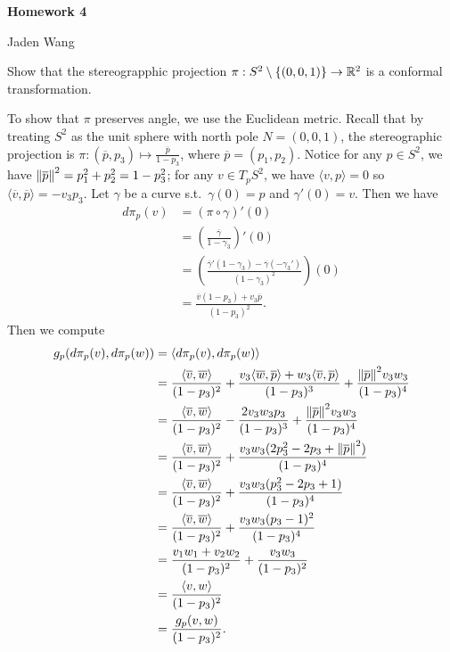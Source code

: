 \documentclass[12pt]{article}
\begin{document}
\centerline {\textsf{\textbf{\LARGE{Homework 4}}}}
\centerline {Jaden Wang}
\vspace{.15in}
\begin{problem}[LN12 0.2.2]
Show that the stereograpphic projection $ \pi: S^2 \setminus \{(0,0,1)\} \to \mathbb{R}^2$ is a conformal transformation.
\end{problem}
To show that $ \pi$ preserves angle, we use the Euclidean metric. Recall that by treating $ S^2$ as the unit sphere with north pole $ N=(0,0,1)$, the stereographic projection is $ \pi: (\overline{p},p_3) \mapsto \frac{\overline{p}}{ 1- p_3}$, where $ \overline{p} = (p_1,p_2)$. Notice for any $ p \in S^2$, we have $ {\left\lVert{ \overline{p}}\right\rVert} ^2 = p_1^2 + p_2^2 = 1- p_3^2 $; for any $ v \in T_p S^2$, we have $ \langle v ,p \rangle = 0$ so $ \langle \overline{v} , \overline{p} \rangle = - v_3p_3$. Let $ \gamma$ be a curve s.t.\ $ \gamma(0) = p$ and $ \gamma'(0) = v$. Then we have
\begin{align*}
	d\pi_p (v) &= (\pi \circ \gamma)'(0)\\
	&= \left( \frac{ \overline{ \gamma}}{ 1- \gamma_3} \right)'(0)  \\
	&= \left( \frac{ \overline{ \gamma}' (1- \gamma_3) - \overline{ \gamma} (- \gamma_3')}{(1- \gamma_3)^2 } \right)(0)  \\
	&= \frac{\overline{v}(1-p_3) + v_3 \overline{p}}{ (1-p_3)^2} .
\end{align*}
Then we compute
\begin{align*}
	g_p(d\pi_p(v),d\pi_p(w)) &= \langle d\pi_p(v),d\pi_p(w) \rangle\\
	&=\frac{\langle \overline{v},\overline{w} \rangle}{ (1-p_3)^2} + \frac{v_3 \langle \overline{w},\overline{p} \rangle + w_3 \langle \overline{v},\overline{p} \rangle}{ (1-p_3)^3} + \frac{{\left\lVert{ \overline{p}}\right\rVert}^2 v_3 w_3 }{ (1-p_3)^{4}}\\
	&= \frac{\langle \overline{v},\overline{w} \rangle}{ (1-p_3)^2} - \frac{2v_3 w_3 p_3 }{ (1-p_3)^3} + \frac{{\left\lVert{ \overline{p}}\right\rVert}^2 v_3 w_3 }{ (1-p_3)^{4}}\\
	&= \frac{\langle \overline{v},\overline{w} \rangle}{ (1-p_3)^2} + \frac{v_3 w_3( 2p_3^2 - 2 p_3 + {\left\lVert{ \overline{p}}\right\rVert}^2) }{ (1-p_3)^{4}}\\
	&= \frac{\langle \overline{v},\overline{w} \rangle}{ (1-p_3)^2} + \frac{v_3 w_3( p_3^2 - 2 p_3 + 1 ) }{ (1-p_3)^{4}}\\
	&= \frac{\langle \overline{v},\overline{w} \rangle}{ (1-p_3)^2} + \frac{v_3 w_3( p_3 - 1 )^2 }{ (1-p_3)^{4}}\\
	&= \frac{ v_1 w_1 + v_2 w_2}{ (1-p_3)^2} + \frac{v_3 w_3}{ (1-p_3)^{2}}\\
	&= \frac{ \langle v,w \rangle}{ (1-p_3)^2} \\
	&= \frac{g_p(v,w)}{ (1- p_3)^2} .
\end{align*}
\end{document}
